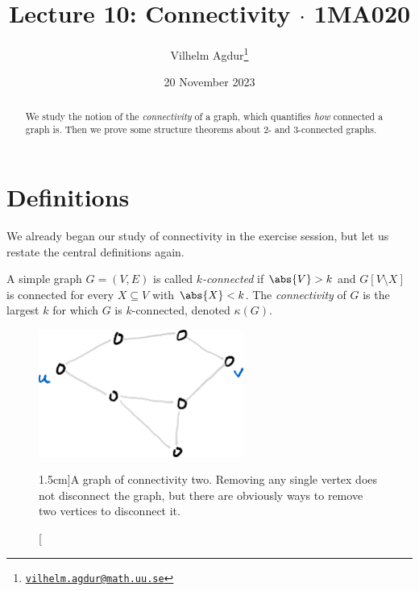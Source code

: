 \documentclass[nobib]{tufte-handout}
\title{Lecture 10: Connectivity $\cdot$ 1MA020}
\author[Vilhelm Agdur]{Vilhelm Agdur\thanks{\href{mailto:vilhelm.agdur@math.uu.se}{\nolinkurl{vilhelm.agdur@math.uu.se}}}}
\date{20 November 2023}
\begin{document}
\maketitle%

\begin{abstract}
\noindent
We study the notion of the \emph{connectivity} of a graph, which quantifies \emph{how} connected a graph is. Then we prove some structure theorems about $2$- and $3$-connected graphs.
\end{abstract}

\section{Definitions}

We already began our study of connectivity in the exercise session, but let us restate the central definitions again.

\begin{definition}
  A simple graph $G = (V,E)$ is called \emph{$k$-connected} if $\abs{V} > k$ and $G[V\setminus X]$ is connected for every $X \subseteq V$ with $\abs{X} < k$. The \emph{connectivity} of $G$ is the largest $k$ for which $G$ is $k$-connected, denoted $\kappa(G)$. 
\end{definition}

\begin{figure}
  \centering
  \includegraphics[width=0.6\textwidth]{graphics/L10_connectivity/twoconnected_graph.png}
  \caption[][1.5cm]{A graph of connectivity two. Removing any single vertex does not disconnect the graph, but there are obviously ways to remove two vertices to disconnect it.}
  \label{fig:twoconnected_graph}
\end{figure}
\end{document}
